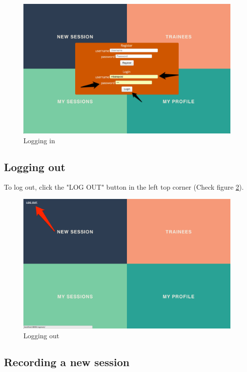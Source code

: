\begin{figure}[htbp]
\centering 
\includegraphics[width=1.0\linewidth]{steps/Login} 
\caption{Logging in} 
\label{fig:login} 
\end{figure} 

\subsection{Logging out}
To log out, click the "LOG OUT" button in the left top corner (Check figure \ref{fig:logout}).

\begin{figure}[htbp]
\centering 
\includegraphics[width=1.0\linewidth]{steps/logout} 
\caption{Logging out} 
\label{fig:logout} 
\end{figure} 

\subsection{Recording a new session}


